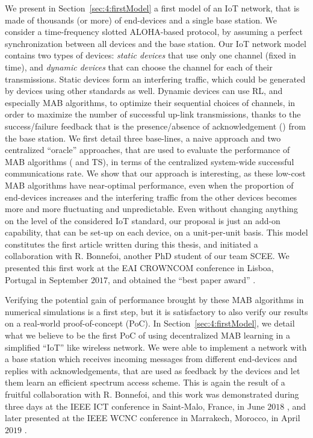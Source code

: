 We present in Section~\ref{sec:4:firstModel} a first model of an IoT network, that is made of thousands (or more) of end-devices and a single base station.
We consider a time-frequency slotted ALOHA-based protocol, by assuming a perfect synchronization between all devices and the base station.
%
Our IoT network model contains two types of devices: \emph{static devices} that use only one channel (fixed in time), and \emph{dynamic devices} that can choose the channel for each of their transmissions.
Static devices form an interfering traffic, which could be generated by devices using other standards as well.
Dynamic devices can use RL, and especially MAB algorithms, to optimize their sequential choices of channels, in order to maximize the number of successful up-link transmissions, thanks to the success/failure feedback that is the presence/absence of acknowledgement (\Ack) from the base station.
%
We first detail three base-lines, a naive approach and two centralized ``oracle'' approaches,
that are used to evaluate the performance of MAB algorithms (\UCB{} and TS), in terms of the centralized system-wide successful communications rate.
We show that our approach is interesting, as these low-cost MAB algorithms have near-optimal performance, even when the proportion of end-devices increases and the interfering traffic from the other devices becomes more and more fluctuating and unpredictable.
%
Even without changing anything on the level of the considered IoT standard, our proposal is just an add-on capability, that can be set-up on each device, on a unit-per-unit basis.
This model constitutes the first article written during this thesis, and initiated a collaboration with R. Bonnefoi, another PhD student of our team SCEE.
We presented this first work at the EAI CROWNCOM conference in Lisboa, Portugal in September $2017$, and obtained the ``best paper award'' \cite{Bonnefoi17}.

Verifying the potential gain of performance brought by these MAB algorithms in numerical simulations is a first step, but it is satisfactory to also verify our results on a real-world proof-of-concept (PoC).
In Section~\ref{sec:4:firstModel}, we detail what we believe to be the first PoC of using decentralized MAB learning in a simplified ``IoT'' like wireless network.
We were able to implement a network with a base station which receives incoming messages from different end-devices and replies with acknowledgements, that are used as feedback by the devices and let them learn an efficient spectrum access scheme.
This is again the result of a fruitful collaboration with R. Bonnefoi, and this work was demonstrated during three days at the IEEE ICT conference in Saint-Malo, France, in June $2018$ \cite{Besson2018ICT}, and later presented at the IEEE WCNC conference in Marrakech, Morocco, in April $2019$ \cite{Besson2019WCNC}.

